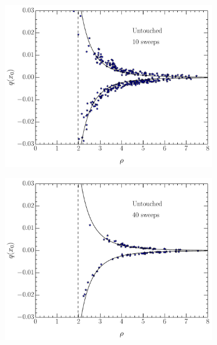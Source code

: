 \begin{figure}
\begin{subfigure}[]{0.5\textwidth}
\label{UTcool10}
\includegraphics[width=\columnwidth]{./UTcool10.pdf}
\end{subfigure}
\begin{subfigure}[]{0.5\textwidth}
\label{UTcool40}
\includegraphics[width=\columnwidth]{./UTcool40.pdf}
\end{subfigure}
\begin{subfigure}[]{0.5\textwidth}
\label{VOcool10}

\end{subfigure}
\end{figure}
